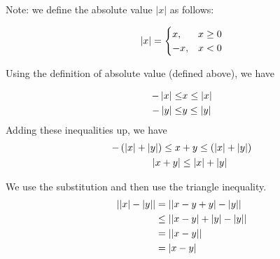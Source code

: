 \documentclass{article}
\begin{document}
\problem{}

Note: we define the absolute value $|x|$ as follows:

$$
\abs{x} = 
\begin{cases}
  x, & x \geq 0 \\
  -x, & x < 0
\end{cases}
$$



Using the definition of absolute value (defined above), we have

\begin{align*}
  -\abs{x} \leq &x \leq \abs{x} \\
  -\abs{y} \leq &y \leq \abs{y}
\end{align*}
Adding these inequalities up, we have
\begin{align*}
  -\pars{\abs{x} + \abs{y}} \leq x & + y \leq \pars{\abs{x} + \abs{y}} \\
  \abs{x + y} &\leq \abs{x} + \abs{y}
\end{align*}


We use the substitution and then use the triangle inequality.
\begin{align*}
  \abs{\abs{x} - \abs{y}} &= \abs{\abs{x - y + y} - \abs{y} } \\
                          &\leq \abs{\abs{x -y} + \abs{y} - \abs{y}} \\
                          &= \abs{\abs{x-y}} \\
                          &= \abs{x-y}
\end{align*}
\end{document}
